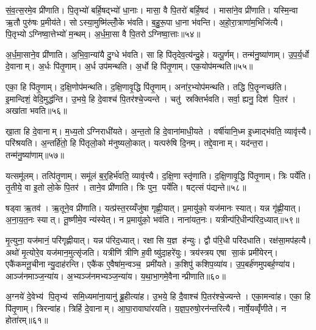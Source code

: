 सं॒व॒त्स॒रमे॒व प्री॑णाति। पि॒तृभ्यो॑ बर्\mbox{}हि॒षद्भ्यो॑ धा॒नाः। मासा॒ वै पि॒तरो॑ बर्\mbox{}हि॒षद॑। मासा॑ने॒व प्री॑णाति। यस्मि॒न्वा ऋ॒तौ पुरु॑षः प्र॒मीय॑ते। सोऽस्या॒मुष्मि॑ल्लोँ॒के भ॑वति। ब॒हु॒रू॒पा धा॒ना भ॑वन्ति। अ॒हो॒रा॒त्राणा॑म॒भिजि॑त्यै। पि॒तृभ्योऽग्निष्वा॒त्तेभ्यो॑ म॒न्थम्। अ॒र्ध॒मा॒सा वै पि॒तरोऽग्निष्वा॒त्ताः॥५४॥

अ॒र्ध॒मा॒साने॒व प्री॑णाति। अ॒भि॒वा॒न्या॑यै दु॒ग्धे भ॑वति। सा हि पि॑तृदेव॒त्य॑न्दु॒हे। यत्पू॒र्णम्। तन्म॑नु॒ष्या॑णाम्। उ॒प॒र्य॒र्धो दे॒वानाम्। अ॒र्धः पि॑तृ॒णाम्। अ॒र्ध उप॑मन्थति। अ॒र्धो हि पि॑तृ॒णाम्। एक॒योप॑मन्थति॥५५॥

एका॒ हि पि॑तृ॒णाम्। द॒क्षि॒णोप॑मन्थति। द॒क्षि॒णावृ॒द्धि पि॑तृ॒णाम्। अना॑र॒भ्योप॑मन्थति। तद्धि पि॒तॄन्गच्छ॑ति। इ॒मान्दिशं॒ वेदि॒मुद्ध॑न्ति। उ॒भये॒ हि दे॒वाश्च॑ पि॒तर॑श्चे॒ज्यन्ते। चतु॑ स्रक्तिर्भवति। सर्वा॒ ह्यनु॒ दिश॑ पि॒तर॑। अखा॑ता भवति॥५६॥

खा॒ता हि दे॒वानाम्। म॒ध्य॒तोऽग्निराधी॑यते। अ॒न्त॒तो हि दे॒वाना॑माधी॒यते। वर्\mbox{}षी॑यानि॒ध्म इ॒ध्माद्भ॑वति॒ व्यावृ॑त्त्यै। परि॑श्रयति। अ॒न्तर्\mbox{}हि॑तो॒ हि पि॑तृलो॒को म॑नुष्यलो॒कात्। यत्परु॑षि दि॒नम्। तद्दे॒वानाम्। यद॑न्त॒रा। तन्म॑नु॒ष्या॑णाम्॥५७॥

यत्समू॑लम्। तत्पि॑तृ॒णाम्। समू॑लं ब॒र्॒हिर्भ॑वति॒ व्यावृ॑त्त्यै। द॒क्षि॒णा स्तृ॑णाति। द॒क्षि॒णावृ॒द्धि पि॑तृ॒णाम्। त्रिः पर्ये॑ति। तृ॒तीये॒ वा इ॒तो लो॒के पि॒तर॑। ताने॒व प्री॑णाति। त्रिः पुन॒ पर्ये॑ति। षट्त्सं प॑द्यन्ते॥५८॥

षड्वा ऋ॒तव॑। ऋ॒तूने॒व प्री॑णाति। यत्प्र॑स्त॒रय्यँजु॑षा गृह्णी॒यात्। प्र॒मायु॑को॒ यज॑मानः स्यात्। यन्न गृ॑ह्णी॒यात्। अ॒ना॒य॒त॒नः स्यात्। तू॒ष्णीमे॒व न्य॑स्येत्। न प्र॒मायु॑को॒ भव॑ति। नाना॑यत॒नः। यत्रीन्प॑रि॒धीन्प॑रिद॒ध्यात्॥५९॥

मृ॒त्युना॒ यज॑मानं॒ परि॑गृह्णीयात्। यन्न प॑रिद॒ध्यात्। रक्षासि य॒ज्ञ ह॑न्युः। द्वौ प॑रि॒धी परि॑दधाति। रक्ष॑सा॒मप॑हत्यै। अथो॑ मृ॒त्योरे॒व यज॑मान॒मुत्सृ॑जति। यत्रीणि॑ त्रीणि ह॒वीष्यु॑दा॒हरे॑युः। त्रय॑स्त्रय एषा सा॒कं प्रमी॑येरन्। एकै॑कमनू॒चीनान्यु॒दाह॑रन्ति। एकै॑क ए॒वैषा॑म॒न्वञ्च॒ प्रमी॑यते। क॒शिपु॑ कशिप॒व्या॑य। उ॒प॒बर्\mbox{}ह॑णमुपबर्\mbox{}ह॒ण्या॑य। आञ्ज॑नमाञ्ज॒न्या॑य। अ॒भ्यञ्ज॑नमभ्यञ्ज॒न्या॑य। य॒था॒भा॒गमे॒वैनान्प्रीणाति॥६०॥

अ॒ग्नये॑ दे॒वेभ्य॑ पि॒तृभ्य॑ समि॒ध्यमा॑ना॒यानु॑ ब्रू॒हीत्या॑ह। उ॒भये॒ हि दै॒वाश्च॑ पि॒तर॑श्चे॒ज्यन्ते। एका॒मन्वा॑ह। एका॒ हि पि॑तृ॒णाम्। त्रिरन्वा॑ह। त्रिर्\mbox{}हि दे॒वानाम्। आ॒घा॒रावाघा॑रयति। य॒ज्ञ॒प॒रुषो॒रन॑न्तरित्यै। नार्\mbox{}षे॒यव्वृँ॑णीते। न होता॑रम्॥६१॥

